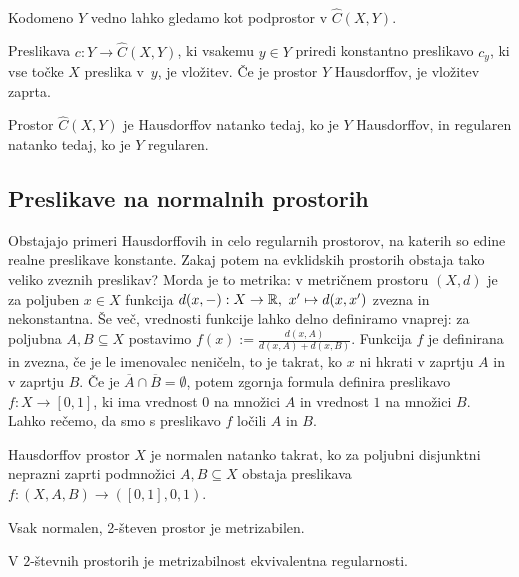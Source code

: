 \ 

Kodomeno $Y$ vedno lahko gledamo kot podprostor v $\widehat{C}(X,Y)$.
\begin{trditev}
    Preslikava $c: Y \to \widehat{C}(X,Y)$, ki vsakemu $y \in Y$ priredi konstantno preslikavo $c_y$, ki vse točke $X$ preslika v~$y$, je vložitev. Če je prostor $Y$ Hausdorffov, je vložitev zaprta.
\end{trditev}

\begin{trditev}
    Prostor $\widehat{C}(X,Y)$ je Hausdorffov natanko tedaj, ko je $Y$ Hausdorffov, in regularen natanko tedaj, ko je $Y$ regularen.
\end{trditev}

\subsection{Preslikave na normalnih prostorih}
Obstajajo primeri Hausdorffovih in celo regularnih prostorov, na katerih so edine realne preslikave konstante. Zakaj potem na evklidskih prostorih obstaja tako veliko zveznih preslikav? Morda je to metrika: v metričnem prostoru $(X,d)$ je za poljuben $x \in X$ funkcija $d(x,-): X \to \mathbb{R}, \ x' \mapsto d(x, x')$ zvezna in nekonstantna. Še več, vrednosti funkcije lahko delno definiramo vnaprej: za poljubna $A, B \subseteq X$ postavimo $f(x) := \frac{d(x, A)}{d(x, A) + d(x, B)}$. Funkcija $f$ je definirana in zvezna, če je le imenovalec neničeln, to je takrat, ko $x$ ni hkrati v zaprtju $A$ in v zaprtju $B$. Če je $\overline{A} \cap \overline{B} = \emptyset$, potem zgornja formula definira preslikavo $f: X \to [0,1]$, ki ima vrednost $0$ na množici $A$ in vrednost $1$ na množici $B$. Lahko rečemo, da smo s preslikavo $f$ ločili $A$ in $B$.

\begin{izrek}
    Hausdorffov prostor $X$ je normalen natanko takrat, ko za poljubni disjunktni neprazni zaprti podmnožici $A, B \subseteq X$ obstaja preslikava $f :(X, A, B) \to ([0,1], 0, 1)$.
\end{izrek}

\begin{izrek}
    Vsak normalen, 2-števen prostor je metrizabilen.
\end{izrek}

\begin{posledica}
    V $2$-števnih prostorih je metrizabilnost ekvivalentna regularnosti.
\end{posledica}

